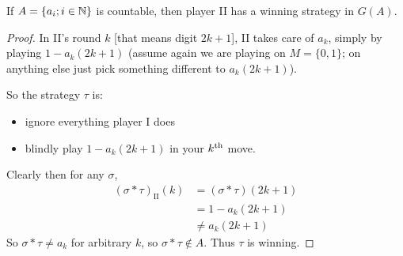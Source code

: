 \documentclass[]{article}
\newcommand{\II}{\textrm{II}}
\begin{document}
\begin{remark}[Proposition]
    If $A = \{a_i;i \in \mathbb{N}\}$ is countable, then player II has a winning strategy in $G(A)$.
\end{remark}
\begin{proof}
    In II's round $k$ [that means digit $2k+1$], II takes care of $a_k$, simply by playing $1 - a_k(2k+1)$ (assume again we are playing on $M = \{0,1\}$; on anything else just pick something different to $a_k(2k+1)$).

    So the strategy $\tau$ is:
    \begin{itemize}
        \item ignore everything player I does
        \item blindly play $1 - a_k(2k+1)$ in your $k^{\textrm{th}}$ move.
    \end{itemize}

    Clearly then for any $\sigma$,
    \begin{align*}
        (\sigma\ast \tau)_\II(k) &= (\sigma \ast \tau)(2k+1)\\
        &= 1 - a_k(2k+1)\\
        &\ne a_k(2k+1)
    \end{align*}
    So $\sigma \ast \tau\ne a_k$ for arbitrary $k$, so $\sigma\ast \tau \not \in A$. Thus $\tau$ is winning.
\end{proof}
\end{document}
